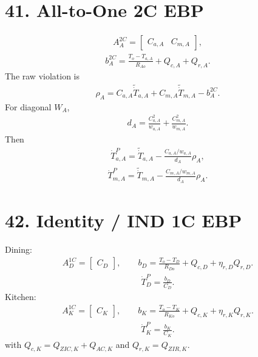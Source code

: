 \documentclass[11pt]{article}
\begin{document}
\section*{41. All-to-One 2C EBP}

\begin{align}
\boxed{A_A^{2C}=\begin{bmatrix}C_{a,A}&C_{m,A}\end{bmatrix},}
\tag{E5.142}
\end{align}
\begin{align}
\boxed{b_A^{2C}=\frac{T_o-T_{a,A}}{R_{Ao}}+Q_{c,A}+Q_{r,A}.}
\tag{E5.143}
\end{align}
The raw violation is
\begin{align}
\boxed{\rho_A=C_{a,A}\widetilde{\dot T}_{a,A}+C_{m,A}\widetilde{\dot T}_{m,A}-b_A^{2C}.}
\tag{E5.144}
\end{align}
For diagonal \(W_A\),
\begin{align}
\boxed{d_A=\frac{C_{a,A}^2}{w_{a,A}}+\frac{C_{m,A}^2}{w_{m,A}}.}
\tag{E5.145}
\end{align}
Then
\begin{align}
\boxed{\dot T_{a,A}^{P}=\widetilde{\dot T}_{a,A}-\frac{C_{a,A}/w_{a,A}}{d_A}\rho_A,}
\tag{E5.146}
\end{align}
\begin{align}
\boxed{\dot T_{m,A}^{P}=\widetilde{\dot T}_{m,A}-\frac{C_{m,A}/w_{m,A}}{d_A}\rho_A.}
\tag{E5.147}
\end{align}

\section*{42. Identity / IND 1C EBP}

Dining:
\begin{align}
\boxed{A_D^{1C}=\begin{bmatrix}C_D\end{bmatrix},\qquad b_D=\frac{T_o-T_D}{R_{Do}}+Q_{c,D}+\eta_{r,D}Q_{r,D}.}
\tag{E5.148}
\end{align}
\begin{align}
\boxed{\dot T_D^P=\frac{b_D}{C_D}.}
\tag{E5.149}
\end{align}
Kitchen:
\begin{align}
\boxed{A_K^{1C}=\begin{bmatrix}C_K\end{bmatrix},\qquad b_K=\frac{T_o-T_K}{R_{Ko}}+Q_{c,K}+\eta_{r,K}Q_{r,K}.}
\tag{E5.150}
\end{align}
\begin{align}
\boxed{\dot T_K^P=\frac{b_K}{C_K}.}
\tag{E5.151}
\end{align}
with \(Q_{c,K}=Q_{ZIC,K}+Q_{AC,K}\) and \(Q_{r,K}=Q_{ZIR,K}\).
\end{document}
